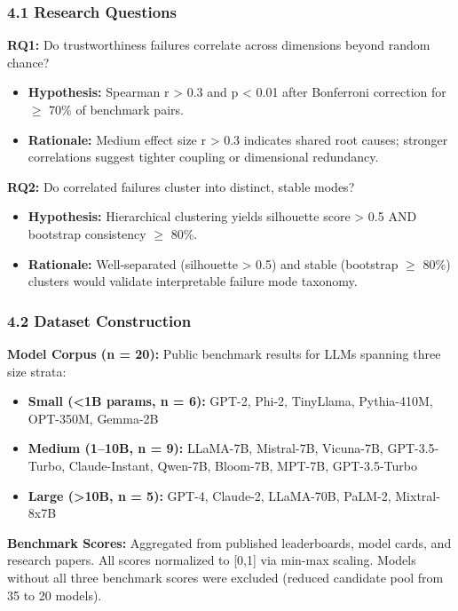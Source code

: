 
\subsubsection{4.1 Research Questions}

\textbf{RQ1:} Do trustworthiness failures correlate across dimensions beyond random chance?
\begin{itemize}
\item \textbf{Hypothesis:} Spearman r > 0.3 and p < 0.01 after Bonferroni correction for $\geq$ 70\% of benchmark pairs.
\item \textbf{Rationale:} Medium effect size r > 0.3 indicates shared root causes; stronger correlations suggest tighter coupling or dimensional redundancy.
\end{itemize}

\textbf{RQ2:} Do correlated failures cluster into distinct, stable modes?
\begin{itemize}
\item \textbf{Hypothesis:} Hierarchical clustering yields silhouette score > 0.5 AND bootstrap consistency $\geq$ 80\%.
\item \textbf{Rationale:} Well-separated (silhouette > 0.5) and stable (bootstrap $\geq$ 80\%) clusters would validate interpretable failure mode taxonomy.
\end{itemize}

\subsubsection{4.2 Dataset Construction}

\textbf{Model Corpus (n = 20):} Public benchmark results for LLMs spanning three size strata:
\begin{itemize}
\item \textbf{Small (<1B params, n = 6):} GPT-2, Phi-2, TinyLlama, Pythia-410M, OPT-350M, Gemma-2B
\item \textbf{Medium (1--10B, n = 9):} LLaMA-7B, Mistral-7B, Vicuna-7B, GPT-3.5-Turbo, Claude-Instant, Qwen-7B, Bloom-7B, MPT-7B, GPT-3.5-Turbo
\item \textbf{Large (>10B, n = 5):} GPT-4, Claude-2, LLaMA-70B, PaLM-2, Mixtral-8x7B
\end{itemize}

\textbf{Benchmark Scores:} Aggregated from published leaderboards, model cards, and research papers. All scores normalized to [0,1] via min-max scaling. Models without all three benchmark scores were excluded (reduced candidate pool from 35 to 20 models).

